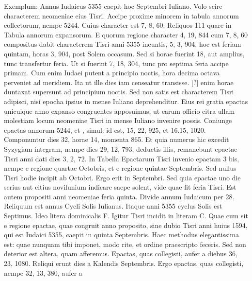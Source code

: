 Exemplum: Annus Iudaicus
5355 caepit hoc Septembri Iuliano.
Volo scire characterem
neomeniae eius Tisri.
Accipe proxime minorem in tabula annorum
collectorum, nempe 5244.
Cuius character est 7, 8, 60.
Reliquos 111 quare in Tabula annorum expansorum.
E quorum
regione character 4, 19, 844 cum 7, 8, 60 compositus dabit characterem
Tisri anni 5355 ineuntis, 5, 3, 904, hoc est feriam quintam,
horas 3, 904, post Solem occasum.
Sed si horae fuerint 18, aut
amplius, tunc transfertur feria.
Ut si fuerint 7, 18, 304, tunc pro septima
feria accipe primam.
Cum enim Iudaei putent a principio noctis,
hora decima octava perveniet ad meridiem.
Ita ut ille dies
iam censeatur transisse.
[?] enim horae duntaxat supersunt ad principium
noctis.
Sed non satis est characterem Tisri adipisci, nisi epocha
ipsius in mense Iuliano deprehenditur.
Eius rei gratia epactas
unicuique anno expanso congruentes apposuimus, ut earum officio
citra ullam molestiam locum neomeniae Tisri in mense Iuliano
invenire possis.
Coniunge epactas annorum 5244, et , simul: id
est, 15, 22, 925, et 16.15, 1020.
Componuntur dies 32, horae 14,
momenta 865.
Et quia numerus hic excedit Syzygiam integram,
nempe dies 29, 12, 793, deductis illis, remanebunt epactae Tisri
anni dati dies 3, 2, 72.
In Tabella Epactarum Tisri invenio epactam
3 bis, nempe e regione quartae Octobris, et e regione quintae
Septembris.
Sed nullus Tisri hodie incipit ab Octobri.
Ergo
erit in Septembri.
Sed quia epactae uno die serius aut citius novilunium
indicare saepe solent, vide quae fit feria Tisri.
Est autem
propositi anni neomeniae feria quinta.
Divide annum Iudaicum
per 28.
Reliquum est annus Cycli Solis Iulianus.
Itaque anni 5355
cyclus Solis est Septimus.
Ideo litera dominicalis \textsc{F}.
Igitur Tisri incidit
in literam \textsc{C}.
Quae cum sit e regione epactae, quae congruit anno
proposito, sine dubio Tisri anni huius 1594, qui est Iudaici 5355,
caepit in quinta Septembris.
Haec methodus elegantissima est: quae
nunquam tibi imponet, modo rite, et ordine praescripto feceris.
%
%
%
Sed
non deterior est altera, quam afferemus.
Epactas, quas collegisti,
aufer a diebus 36, 23, 1080.
Reliqui erunt dies a Kalendis Septembris.
Ergo epactas, quas collegisti, nempe 32, 13, 380, aufer a
